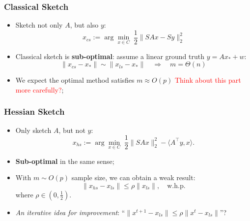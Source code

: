 \documentclass{beamer}
\begin{document}
\begin{frame}
    \frametitle{Classical Sketch}
    
    \begin{itemize}
        \item<1-> Sketch not only $A$, but also $y$:
            \begin{equation*}
                x_{cs} := \arg\min_{x \in C} \; \frac{1}{2} \|SAx-Sy\|^2_2
           \end{equation*}
       \item<2-> Classical sketch is \textbf{sub-optimal}:
           assume a linear ground truth $y = Ax_* + w$:
           \begin{equation*}
               \|x_{cs} - x_*\| \sim \|x_{ls} - x_*\|
               \quad \Rightarrow \quad
               m = \Theta(n)
           \end{equation*}
       \item<3-> We expect the optimal method satisfies $m \approx O(p)$
           \textcolor{red}{Think about this part more carefully?};
    \end{itemize}

\end{frame}

\begin{frame}
    \frametitle{Hessian Sketch}
    \begin{itemize}
        \item<1-> Only sketch $A$, but not $y$:
            \begin{equation*}
                x_{hs} := \arg\min_{x\in C} \; \frac{1}{2} \| S Ax\|^2_2 - \langle A^\top y, x \rangle.
            \end{equation*}
        \item<2-> \textbf{Sub-optimal} in the same sense;
        \item<3-> With $m \sim O(p)$ sample size, we can obtain a weak result:
            \begin{equation*}
                \| x_{hs} - x_{ls} \| \leq \rho \|x_{ls}\|,
                \quad \text{w.h.p.}
            \end{equation*}
            where $\rho \in (0, \frac{1}{2})$.
        \item<4-> \textit{An iterative idea for improvement}: ``$\| x^{t+1} - x_{ls} \| \leq
            \rho \|x^{t} - x_{ls}\|$''?
    \end{itemize}
\end{frame}
\end{document}
